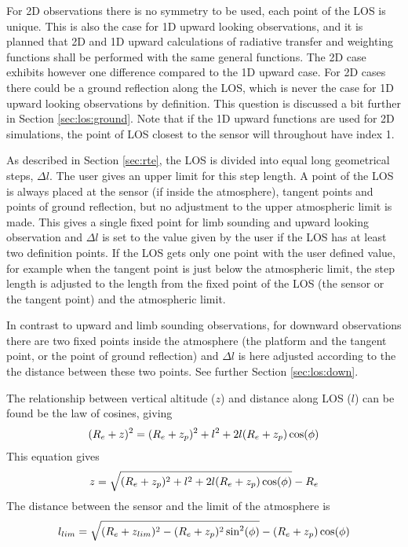  For 2D observations there is no symmetry to be used, each point of
 the LOS is unique. This is also the case for 1D upward looking
 observations, and it is planned that 2D and 1D upward calculations of
 radiative transfer and weighting functions shall be performed with
 the same general functions.  The 2D case exhibits however one
 difference compared to the 1D upward case. For 2D cases there could
 be a ground reflection along the LOS, which is never the case for 1D
 upward looking observations by definition. This question is discussed
 a bit further in Section \ref{sec:los:ground}. Note that if the 1D
 upward functions are used for 2D simulations, the point of LOS
 closest to the sensor will throughout have index 1.


 
 \label{sec:rte:stepl}
 
 As described in Section \ref{sec:rte}, the LOS is divided into equal
 long geometrical steps, $\Delta l$. The user gives an upper limit for
 this step length. A point of the LOS is always placed at the sensor
 (if inside the atmosphere), tangent points and points of ground
 reflection, but no adjustment to the upper atmospheric limit is made.
 This gives a single fixed point for limb sounding and upward looking
 observation and $\Delta l$ is set to the value given by the user if
 the LOS has at least two definition points. If the LOS gets only one
 point with the user defined value, for example when the tangent point
 is just below the atmospheric limit, the step length is adjusted to
 the length from the fixed point of the LOS (the sensor or the tangent 
 point) and the atmospheric limit.
 
 In contrast to upward and limb sounding observations, for downward
 observations there are two fixed points inside the atmosphere (the
 platform and the tangent point, or the point of ground reflection)
 and $\Delta l$ is here adjusted according to the the distance between
 these two points. See further Section \ref{sec:los:down}.



  
  \label{sec:los:up}
  
  The relationship between vertical altitude ($z$) and distance along
  LOS ($l$) can be found be the law of cosines, giving
  \begin{equation}
    (R_e+z)^2 = (R_e+z_p)^2 + l^2 + 2l(R_e+z_p)\cos(\phi)
  \end{equation}
  This equation gives
  \begin{equation}
    z = \sqrt{ (R_e+z_p)^2 + l^2 + 2l(R_e+z_p)\cos(\phi) } - R_e
  \end{equation}
  The distance between the sensor and the limit of the atmosphere is
  \begin{equation}
      l_{lim} = \sqrt{ (R_e+z_{lim})^2 - (R_e+z_p)^2\sin^2(\phi) } - 
                                       (R_e+z_p)\cos(\phi)
  \end{equation}


